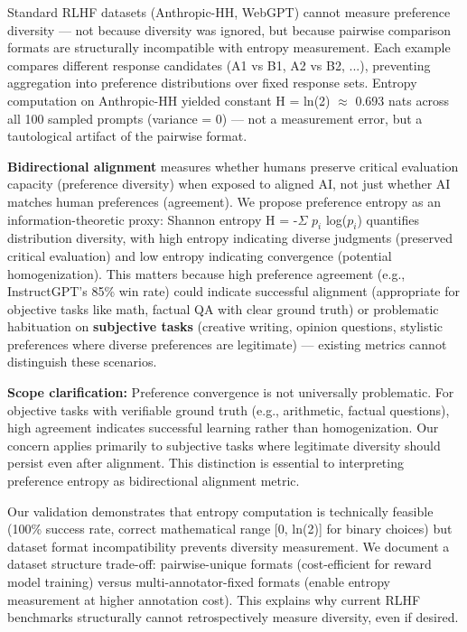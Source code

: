 Standard RLHF datasets (Anthropic-HH, WebGPT) cannot measure preference diversity — not because diversity was ignored, but because pairwise comparison formats are structurally incompatible with entropy measurement. Each example compares different response candidates (A1 vs B1, A2 vs B2, ...), preventing aggregation into preference distributions over fixed response sets. Entropy computation on Anthropic-HH yielded constant H = ln(2) $\approx$ 0.693 nats across all 100 sampled prompts (variance = 0) — not a measurement error, but a tautological artifact of the pairwise format.

\textbf{Bidirectional alignment} measures whether humans preserve critical evaluation capacity (preference diversity) when exposed to aligned AI, not just whether AI matches human preferences (agreement). We propose preference entropy as an information-theoretic proxy: Shannon entropy H = -$\Sigma$ $p_i$ log($p_i$) quantifies distribution diversity, with high entropy indicating diverse judgments (preserved critical evaluation) and low entropy indicating convergence (potential homogenization). This matters because high preference agreement (e.g., InstructGPT's 85\% win rate) could indicate successful alignment (appropriate for objective tasks like math, factual QA with clear ground truth) or problematic habituation on \textbf{subjective tasks} (creative writing, opinion questions, stylistic preferences where diverse preferences are legitimate) — existing metrics cannot distinguish these scenarios.

\textbf{Scope clarification:} Preference convergence is not universally problematic. For objective tasks with verifiable ground truth (e.g., arithmetic, factual questions), high agreement indicates successful learning rather than homogenization. Our concern applies primarily to subjective tasks where legitimate diversity should persist even after alignment. This distinction is essential to interpreting preference entropy as bidirectional alignment metric.

Our validation demonstrates that entropy computation is technically feasible (100\% success rate, correct mathematical range [0, ln(2)] for binary choices) but dataset format incompatibility prevents diversity measurement. We document a dataset structure trade-off: pairwise-unique formats (cost-efficient for reward model training) versus multi-annotator-fixed formats (enable entropy measurement at higher annotation cost). This explains why current RLHF benchmarks structurally cannot retrospectively measure diversity, even if desired.

